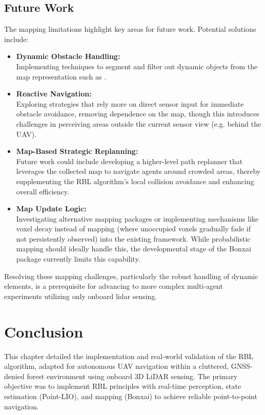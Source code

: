             \subsection{Future Work}
                The mapping limitations highlight key areas for future work. Potential solutions include:
                \begin{itemize}
                    \item \textbf{Dynamic Obstacle Handling: }\\
                    Implementing techniques to segment and filter out dynamic objects from the map representation such as \cite{TRLO_good_mapping}.
                    \item \textbf{Reactive Navigation: }\\
                    Exploring strategies that rely more on direct sensor input for immediate obstacle avoidance, removing dependence on the map, though this introduces challenges in perceiving areas outside the current sensor view (e.g. behind the UAV).
                    \item \textbf{Map-Based Strategic Replanning:} \\
                    Future work could include developing a higher-level path replanner that leverages the collected map to navigate agents around crowded areas, thereby supplementing the \ac{RBL} algorithm's local collision avoidance and enhancing overall efficiency.
                    \item \textbf{Map Update Logic: }\\
                    Investigating alternative mapping packages or implementing mechanisms like voxel decay instead of mapping (where unoccupied voxels gradually fade if not persistently observed) into the existing framework. 
                    While probabilistic mapping should ideally handle this, the developmental stage of the Bonxai package currently limits this capability.
                \end{itemize}
                Resolving these mapping challenges, particularly the robust handling of dynamic elements, is a prerequisite for advancing to more complex multi-agent experiments utilizing only onboard lidar sensing.
    
    \section{Conclusion}
    \label{sec:conclusion_lidar}
        This chapter detailed the implementation and real-world validation of the \ac{RBL} algorithm, adapted for autonomous \ac{UAV} navigation within a cluttered, \ac{GNSS}-denied forest environment using onboard 3D \ac{LiDAR} sensing. 
        The primary objective was to implement \ac{RBL} principles with real-time perception, state estimation (\ac{Point-LIO}), and mapping (Bonxai) to achieve reliable point-to-point navigation.

